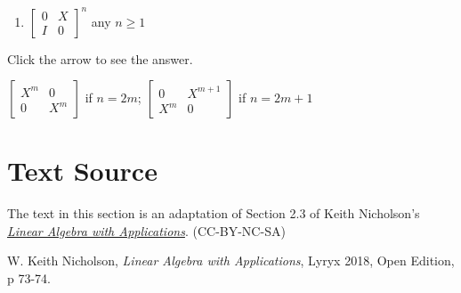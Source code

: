 \documentclass{ximera}
\begin{document}
\begin{problem}
\begin{enumerate}
\item %
$\left[ \begin{array}{cc}
0 & X \\
I & 0
\end{array} \right]^{n}
$ any $n \geq 1$
\end{enumerate}

Click the arrow to see the answer.
\begin{expandable}
$\left[ \begin{array}{cc}
X^{m} & 0 \\
0 & X^{m}
\end{array} \right]$ if $n = 2m$;
$\left[ \begin{array}{cc}
0 & X^{m + 1} \\
X^{m} & 0
\end{array} \right]$ if $n = 2m + 1$
\end{expandable}


\end{problem}

\section*{Text Source}
The text in this section is an adaptation of Section 2.3 of Keith Nicholson's \href{https://open.umn.edu/opentextbooks/textbooks/linear-algebra-with-applications}{\it Linear Algebra with Applications}. (CC-BY-NC-SA)

W. Keith Nicholson, {\it Linear Algebra with Applications}, Lyryx 2018, Open Edition, p 73-74.
\end{document}
